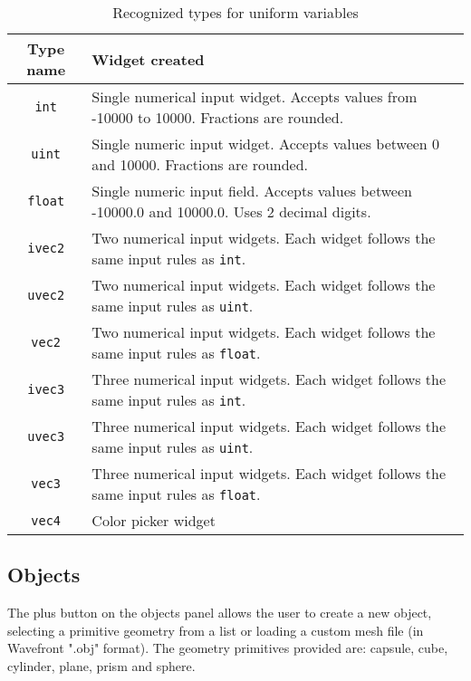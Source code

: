 \begin{table}
    \centering
    \caption{Recognized types for uniform variables}
    \begin{tabular}{|c|p{10cm}|}
        \hline
        Type name & Widget created \\
        \hline \hline
        \texttt{int} & Single numerical input widget. Accepts values from -10000 to 10000. Fractions are rounded. \\ \hline
        \texttt{uint} & Single numeric input widget. Accepts values between 0 and 10000. Fractions are rounded. \\ \hline
        \texttt{float} & Single numeric input field. Accepts values between -10000.0 and 10000.0. Uses 2 decimal digits. \\ \hline
        \texttt{ivec2} & Two numerical input widgets. Each widget follows the same input rules as \texttt{int}. \\ \hline
        \texttt{uvec2} & Two numerical input widgets. Each widget follows the same input rules as \texttt{uint}. \\ \hline
        \texttt{vec2} & Two numerical input widgets. Each widget follows the same input rules as \texttt{float}. \\ \hline
        \texttt{ivec3} & Three numerical input widgets. Each widget follows the same input rules as \texttt{int}. \\ \hline
        \texttt{uvec3} & Three numerical input widgets. Each widget follows the same input rules as \texttt{uint}. \\ \hline
        \texttt{vec3} & Three numerical input widgets. Each widget follows the same input rules as \texttt{float}. \\ \hline
        \texttt{vec4} & Color picker widget \\
        \hline
    \end{tabular}
    \label{tab:uniform_types}
\end{table}

\subsection{Objects}

The plus button on the objects panel allows the user to create a new object, selecting a primitive geometry from a list or loading a custom mesh file (in Wavefront ".obj" format). The geometry primitives provided are: capsule, cube, cylinder, plane, prism and sphere.

